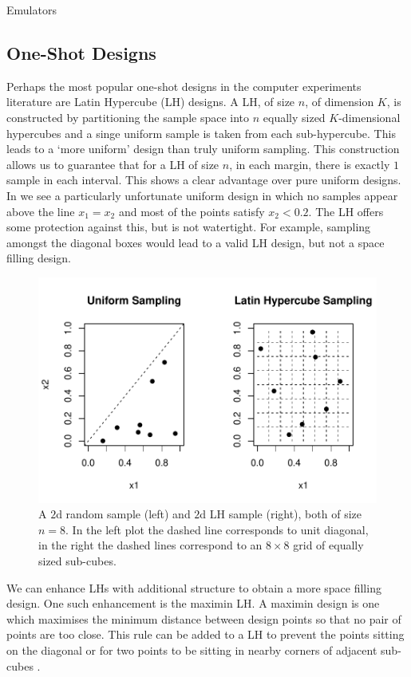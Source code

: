 \begin{chapter}{Emulators \label{Ch:Emulators}}
\subsection{One-Shot Designs}
Perhaps the most popular one-shot designs in the computer experiments literature are Latin Hypercube (LH) designs. A LH, of size $n$, of dimension $K$, is constructed by partitioning the sample space into $n$ equally sized $K$-dimensional hypercubes and a singe uniform sample is taken from each sub-hypercube. This leads to a `more uniform' design than truly uniform sampling. This construction allows us to guarantee that for a LH of size $n$, in each margin, there is exactly $1$ sample in each interval. This shows a clear advantage over pure uniform designs. In  we see a particularly unfortunate uniform design in which no samples appear above the line $x_1=x_2$ and most of the points satisfy $x_2 < 0.2$. The LH offers some protection against this, but is not watertight. For example, sampling amongst the diagonal boxes would lead to a valid LH design, but not a space filling design.
\begin{figure}[h]
  \centering
  \includegraphics{fig-emulators/rand-latin.pdf}
  \caption{A $2$d random sample (left) and $2$d LH sample (right), both of size $n = 8$. In the left plot the dashed line corresponds to unit diagonal, in the right the dashed lines correspond to an $8 \times 8$ grid of equally sized sub-cubes.}
  \label{Fig:rand-lh}
\end{figure}
We can enhance LHs with additional structure to obtain a more space filling design. One such enhancement is the maximin LH. A maximin design is one which maximises the minimum distance between design points so that no pair of points are too close. This rule can be added to a LH to prevent the points sitting on the diagonal or for two points to be sitting in nearby corners of adjacent sub-cubes \citep{Mckay1979, Morris1995}.

\end{chapter}

